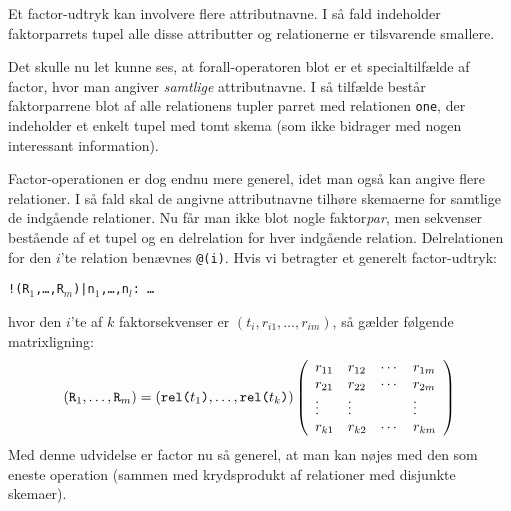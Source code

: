 Et factor-udtryk kan involvere flere attributnavne. I s\aa{} fald indeholder
faktorparrets tupel alle disse attributter og relationerne er tilsvarende
smallere. 


Det skulle nu let kunne ses, at forall-operatoren blot er et specialtilf\ae{}lde
af factor, hvor man angiver {\em samtlige\/} attributnavne. I s\aa{} tilf\ae{}lde
best\aa{}r faktorparrene blot af alle relationens tupler parret med
relationen \verb"one", der indeholder et enkelt tupel med tomt skema
(som ikke bidrager med nogen interessant information).

Factor-operationen er dog endnu mere generel, idet man ogs\aa{} kan angive
flere relationer. I s\aa{} fald skal de angivne attributnavne tilh\o{}re
skemaerne for samtlige de indg\aa{}ende relationer. Nu f\aa{}r man ikke blot
nogle faktor{\em par}, men sekvenser best\aa{}ende af et tupel og en delrelation for
hver indg\aa{}ende relation. Delrelationen for den $i$'te relation ben\ae{}vnes
\verb"@(i)". Hvis vi betragter et generelt factor-udtryk:
\begin{center}
{\tt !(R$_1$,\ldots,R$_m$)|n$_1$,\ldots,n$_l$: \ldots}
\end{center}
hvor den $i$'te af $k$ faktorsekvenser er $(t_i,r_{i1},\ldots,r_{im})$, s\aa{}
g\ae{}lder f\o{}lgende matrixligning:
$$ (\mbox{\tt R}_1,\ldots,\mbox{\tt R}_m) = 
   (\mbox{\tt rel(}t_1\mbox{\tt )},\ldots,\mbox{\tt rel(}t_k\mbox{\tt )})
   \left(\begin{array}{llll}
   r_{11} & r_{12} & \cdots & r_{1m} \\
   r_{21} & r_{22} & \cdots & r_{2m} \\
   \vdots & \vdots & & \vdots \\
   r_{k1} & r_{k2} & \cdots & r_{km} 
   \end{array}\right)
$$
Med denne udvidelse er factor nu s\aa{} generel, at man kan n\o{}jes med
den som eneste operation (sammen med krydsprodukt af relationer med
disjunkte skemaer).


